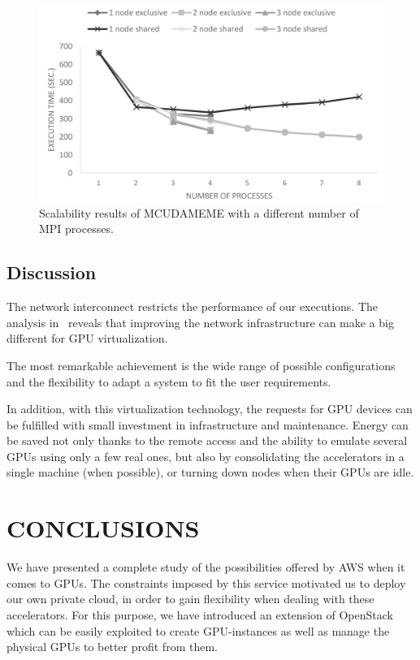 \documentclass[a4paper,twoside]{article}
\begin{document}
\begin{figure}[htb]
  \centering
  \includegraphics[width=\linewidth]{images/mcudameme-os.pdf}
  \caption{Scalability results of MCUDAMEME with a different number of MPI processes.}
  \label{fig3}
\end{figure}

\subsection{Discussion}
The network interconnect restricts the performance of our executions.
The analysis in~\cite{tonithesis} reveals that improving the network infrastructure can make a big different for GPU virtualization.

The most remarkable achievement is the wide range of possible configurations and the flexibility to adapt a system to fit the user requirements. 

In addition, with this virtualization technology, the requests for GPU devices can be fulfilled with small investment in infrastructure and maintenance.
Energy can be saved not only thanks to the remote access and the ability to emulate several GPUs using only a few real ones, but also by consolidating the accelerators in a single machine (when possible), or turning down nodes when their GPUs are idle. 

\section{\uppercase{Conclusions}}
\label{sec:conclusions}
We have presented a complete study of the possibilities offered by AWS when it comes to GPUs. 
The constraints imposed by this service motivated us to deploy our own private cloud, in order to gain flexibility when dealing with these accelerators.
For this purpose, we have introduced an extension of OpenStack which can be easily exploited to create GPU-instances as well as manage the physical GPUs to better profit from them.
\end{document}
